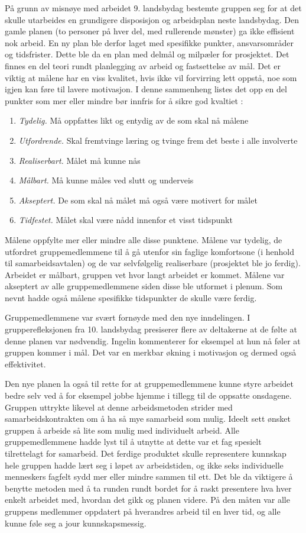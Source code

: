 På grunn av misnøye med arbeidet 9. landsbydag bestemte gruppen seg for at det skulle utarbeides en grundigere disposisjon og arbeidsplan neste landsbydag.
Den gamle planen (to personer på hver del, med rullerende mønster) ga ikke effisient nok arbeid.
En ny plan ble derfor laget med spesifikke punkter, ansvarsområder og tidsfrister.
Dette ble da en plan med delmål og milpæler for prosjektet.
Det finnes en del teori rundt planlegging av arbeid og fastsettelse av mål.
Det er viktig at målene har en viss kvalitet, hvis ikke vil forvirring lett oppstå, noe som igjen kan føre til lavere motivasjon.
I denne sammenheng listes det opp en del punkter som mer eller mindre bør innfris for å sikre god kvaltiet \cite{prosjekteringsledelse}:
\begin{enumerate}
\item \textit{Tydelig.} Må oppfattes likt og entydig av de som skal nå målene
\item \textit{Utfordrende.} Skal fremtvinge læring og tvinge frem det beste i alle involverte
\item \textit{Realiserbart.} Målet må kunne nås
\item \textit{Målbart.} Må kunne måles ved slutt og underveis
\item \textit{Akseptert.} De som skal nå målet må også være motivert for målet
\item \textit{Tidfestet.} Målet skal være nådd innenfor et visst tidspunkt
\end{enumerate}
Målene oppfylte mer eller mindre alle disse punktene.
Målene var tydelig, de utfordret gruppemedlemmene til å gå utenfor sin faglige komfortsone (i henhold til samarbeidsavtalen) og de var selvfølgelig realiserbare (prosjektet ble jo ferdig).
Arbeidet er målbart, gruppen vet hvor langt arbeidet er kommet.
Målene var akseptert av alle gruppemedlemmene siden disse ble utformet i plenum.
Som nevnt hadde også målene spesifikke tidspunkter de skulle være ferdig. 

Gruppemedlemmene var svært fornøyde med den nye inndelingen.
I grupperefleksjonen fra 10. landsbydag presiserer flere av deltakerne at de følte at denne planen var nødvendig.
Ingelin kommenterer for eksempel at hun nå føler at gruppen kommer i mål.
Det var en merkbar økning i motivasjon og dermed også effektivitet.

Den nye planen la også til rette for at gruppemedlemmene kunne styre arbeidet bedre selv ved å for eksempel jobbe hjemme i tillegg til de oppsatte onsdagene.
Gruppen uttrykte likevel at denne arbeidsmetoden strider med samarbeidskontrakten om å ha så mye samarbeid som mulig.
Ideelt sett ønsket gruppen å arbeide så lite som mulig med individuelt arbeid.
Alle gruppemedlemmene hadde lyst til å utnytte at dette var et fag spesielt tilrettelagt for samarbeid.
Det ferdige produktet skulle representere kunnskap hele gruppen hadde lært seg i løpet av arbeidstiden, og ikke seks individuelle menneskers fagfelt sydd mer eller mindre sammen til ett.
Det ble da viktigere å benytte metoden med å ta runden rundt bordet for å raskt presentere hva hver enkelt arbeidet med, hvordan det gikk og planen videre.
På den måten var alle gruppens medlemmer oppdatert på hverandres arbeid til en hver tid, og alle kunne føle seg a jour kunnskapsmessig.

